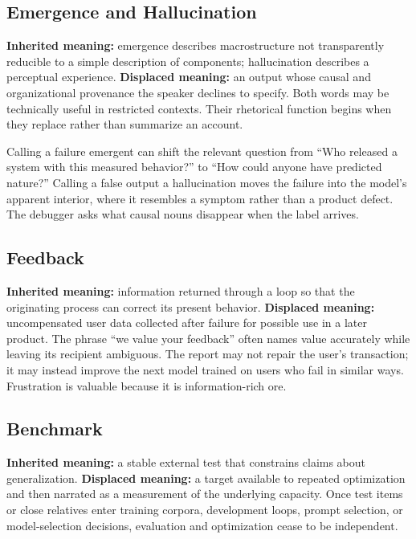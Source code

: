 \documentclass[11pt]{article}
\begin{document}
\subsection*{Emergence and Hallucination}

\textbf{Inherited meaning:} emergence describes macrostructure not transparently reducible to a simple description of components; hallucination describes a perceptual experience. \textbf{Displaced meaning:} an output whose causal and organizational provenance the speaker declines to specify. Both words may be technically useful in restricted contexts. Their rhetorical function begins when they replace rather than summarize an account.

Calling a failure emergent can shift the relevant question from \enquote{Who released a system with this measured behavior?} to \enquote{How could anyone have predicted nature?} Calling a false output a hallucination moves the failure into the model's apparent interior, where it resembles a symptom rather than a product defect. The debugger asks what causal nouns disappear when the label arrives.

\subsection*{Feedback}

\textbf{Inherited meaning:} information returned through a loop so that the originating process can correct its present behavior. \textbf{Displaced meaning:} uncompensated user data collected after failure for possible use in a later product. The phrase \enquote{we value your feedback} often names value accurately while leaving its recipient ambiguous. The report may not repair the user's transaction; it may instead improve the next model trained on users who fail in similar ways. Frustration is valuable because it is information-rich ore.

\subsection*{Benchmark}

\textbf{Inherited meaning:} a stable external test that constrains claims about generalization. \textbf{Displaced meaning:} a target available to repeated optimization and then narrated as a measurement of the underlying capacity. Once test items or close relatives enter training corpora, development loops, prompt selection, or model-selection decisions, evaluation and optimization cease to be independent.
\end{document}
